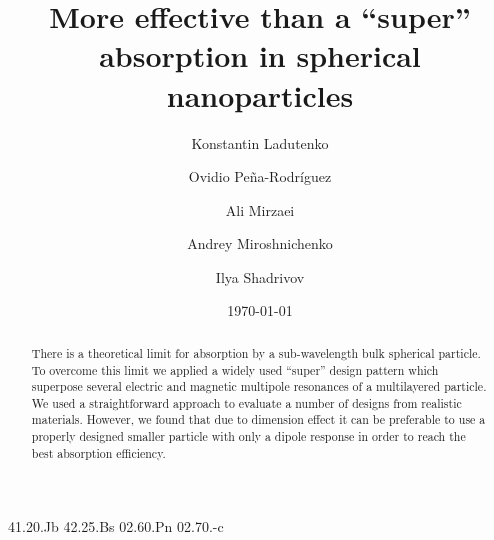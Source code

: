 \documentclass[aps,prl,twocolumn,showpacs,superscriptaddress,groupedaddress]{revtex4-1}
\begin{document}

\title{More effective than a ``super'' absorption in spherical nanoparticles}


\author{Konstantin Ladutenko} 


\author{Ovidio Pe\~{n}a-Rodr\'{i}guez} 


\author{Ali Mirzaei} 
\author{Andrey Miroshnichenko}
\author{Ilya Shadrivov}

\date{\today}

\begin{abstract}
  There is a theoretical limit for absorption by a sub-wavelength bulk
  spherical particle.  To overcome this limit we applied a widely used
  ``super'' design pattern which superpose several electric and
  magnetic multipole resonances of a multilayered particle.  We used a
  straightforward approach to evaluate a number of designs from realistic
  materials.  However, we found that due to dimension effect it can be
  preferable to use a properly designed smaller particle with only a
  dipole response in order to reach the best absorption efficiency.
\end{abstract}


\pacs%
{41.20.Jb 42.25.Bs 02.60.Pn 02.70.-c}
\end{document}
